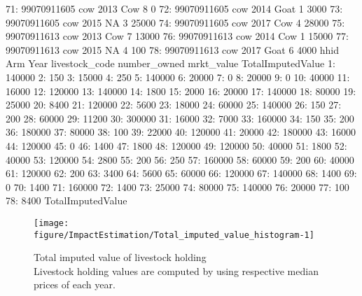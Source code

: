 \begin{Schunk}
\begin{Soutput}
71: 99070911605         cow 2013            Cow            8          0
72: 99070911605         cow 2014           Goat            1       3000
73: 99070911605         cow 2015             NA            3      25000
74: 99070911605         cow 2017            Cow            4      28000
75: 99070911613         cow 2013            Cow            7      13000
76: 99070911613         cow 2014            Cow            1      15000
77: 99070911613         cow 2015             NA            4        100
78: 99070911613         cow 2017           Goat            6       4000
           hhid         Arm Year livestock_code number_owned mrkt_value
    TotalImputedValue
 1:            140000
 2:               150
 3:             15000
 4:               250
 5:            140000
 6:             20000
 7:                 0
 8:             20000
 9:                 0
10:             40000
11:             16000
12:            120000
13:            140000
14:              1800
15:              2000
16:             20000
17:            140000
18:             80000
19:             25000
20:              8400
21:            120000
22:              5600
23:             18000
24:             60000
25:            140000
26:               150
27:               200
28:             60000
29:             11200
30:            300000
31:             16000
32:              7000
33:            160000
34:               150
35:               200
36:            180000
37:             80000
38:               100
39:             22000
40:            120000
41:             20000
42:            180000
43:             16000
44:            120000
45:                 0
46:              1400
47:              1800
48:            120000
49:            120000
50:             40000
51:              1800
52:             40000
53:            120000
54:              2800
55:               200
56:               250
57:            160000
58:             60000
59:               200
60:             40000
61:            120000
62:               200
63:              3400
64:              5600
65:             60000
66:            120000
67:            140000
68:              1400
69:                 0
70:              1400
71:            160000
72:              1400
73:             25000
74:             80000
75:            140000
76:             20000
77:               100
78:              8400
    TotalImputedValue
\end{Soutput}
\end{Schunk}
\begin{Schunk}
\begin{figure}

{\centering \texttt{[image: figure/ImpactEstimation/Total\_imputed\_value\_histogram-1]} 

}

\caption{Total imputed value of livestock holding\\ {\footnotesize Livestock holding values are computed by using respective median prices of each year.\setlength{\baselineskip}{8pt}}}\label{Figure Total imputed value histogram}
\end{figure}
\end{Schunk}
